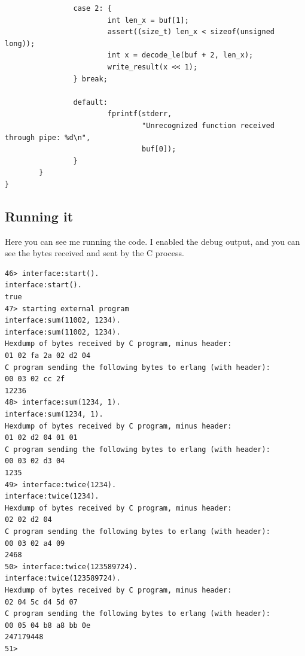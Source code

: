 \documentclass[11pt]{article}
\begin{document}
\begin{verbatim}
                case 2: {
                        int len_x = buf[1];
                        assert((size_t) len_x < sizeof(unsigned long));
                        int x = decode_le(buf + 2, len_x);
                        write_result(x << 1);
                } break;

                default:
                        fprintf(stderr,
                                "Unrecognized function received through pipe: %d\n",
                                buf[0]);
                }
        }
}
\end{verbatim}

\subsection{Running it}
\label{sec:orgf716bed}
Here you can see me running the code. I enabled the debug output,
and you can see the bytes received and sent by the C process.

\begin{verbatim}
46> interface:start().
interface:start().
true
47> starting external program
interface:sum(11002, 1234).
interface:sum(11002, 1234).
Hexdump of bytes received by C program, minus header:
01 02 fa 2a 02 d2 04 
C program sending the following bytes to erlang (with header):
00 03 02 cc 2f 
12236
48> interface:sum(1234, 1).
interface:sum(1234, 1).
Hexdump of bytes received by C program, minus header:
01 02 d2 04 01 01 
C program sending the following bytes to erlang (with header):
00 03 02 d3 04 
1235
49> interface:twice(1234).
interface:twice(1234).
Hexdump of bytes received by C program, minus header:
02 02 d2 04 
C program sending the following bytes to erlang (with header):
00 03 02 a4 09 
2468
50> interface:twice(123589724).
interface:twice(123589724).
Hexdump of bytes received by C program, minus header:
02 04 5c d4 5d 07 
C program sending the following bytes to erlang (with header):
00 05 04 b8 a8 bb 0e 
247179448
51> 
\end{verbatim}
\end{document}
